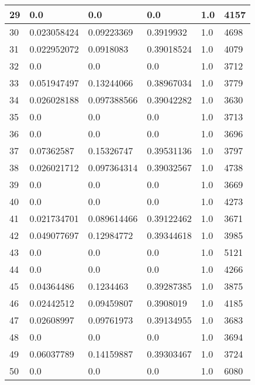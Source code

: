 \begin{longtable}{|l|l|l|l|l|l|}
29 & 0.0 & 0.0 & 0.0 & 1.0 & 4157 \\ \hline 
30 & 0.023058424 & 0.09223369 & 0.3919932 & 1.0 & 4698 \\ \hline 
31 & 0.022952072 & 0.0918083 & 0.39018524 & 1.0 & 4079 \\ \hline 
32 & 0.0 & 0.0 & 0.0 & 1.0 & 3712 \\ \hline 
33 & 0.051947497 & 0.13244066 & 0.38967034 & 1.0 & 3779 \\ \hline 
34 & 0.026028188 & 0.097388566 & 0.39042282 & 1.0 & 3630 \\ \hline 
35 & 0.0 & 0.0 & 0.0 & 1.0 & 3713 \\ \hline 
36 & 0.0 & 0.0 & 0.0 & 1.0 & 3696 \\ \hline 
37 & 0.07362587 & 0.15326747 & 0.39531136 & 1.0 & 3797 \\ \hline 
38 & 0.026021712 & 0.097364314 & 0.39032567 & 1.0 & 4738 \\ \hline 
39 & 0.0 & 0.0 & 0.0 & 1.0 & 3669 \\ \hline 
40 & 0.0 & 0.0 & 0.0 & 1.0 & 4273 \\ \hline 
41 & 0.021734701 & 0.089614466 & 0.39122462 & 1.0 & 3671 \\ \hline 
42 & 0.049077697 & 0.12984772 & 0.39344618 & 1.0 & 3985 \\ \hline 
43 & 0.0 & 0.0 & 0.0 & 1.0 & 5121 \\ \hline 
44 & 0.0 & 0.0 & 0.0 & 1.0 & 4266 \\ \hline 
45 & 0.04364486 & 0.1234463 & 0.39287385 & 1.0 & 3875 \\ \hline 
46 & 0.02442512 & 0.09459807 & 0.3908019 & 1.0 & 4185 \\ \hline 
47 & 0.02608997 & 0.09761973 & 0.39134955 & 1.0 & 3683 \\ \hline 
48 & 0.0 & 0.0 & 0.0 & 1.0 & 3694 \\ \hline 
49 & 0.06037789 & 0.14159887 & 0.39303467 & 1.0 & 3724 \\ \hline 
50 & 0.0 & 0.0 & 0.0 & 1.0 & 6080 \\ \hline 
\end{longtable}